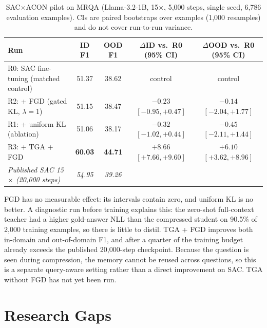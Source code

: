 \documentclass[10pt,a4paper]{article}
\begin{document}
\begin{table}[h]
\centering
\scriptsize
\renewcommand{\arraystretch}{1.12}
\setlength{\tabcolsep}{4pt}
\begin{tabular}{p{}cccc}
\toprule
\textbf{Run} & \textbf{ID F1} & \textbf{OOD F1} &
\textbf{$\Delta$ID vs.\ R0 (95\% CI)} & \textbf{$\Delta$OOD vs.\ R0 (95\% CI)}\\
\midrule
R0: SAC fine-tuning (matched control) & 51.37 & 38.62 & control & control\\
R2: + FGD (gated KL, $\lambda=1$) & 51.15 & 38.47 & $-0.23$ $[-0.95,+0.47]$ & $-0.14$ $[-2.04,+1.77]$\\
R1: + uniform KL (ablation) & 51.06 & 38.17 & $-0.32$ $[-1.02,+0.44]$ & $-0.45$ $[-2.11,+1.44]$\\
R3: + TGA + FGD & \textbf{60.03} & \textbf{44.71} & $\mathbf{+8.66}$ $[+7.66,+9.60]$ & $\mathbf{+6.10}$ $[+3.62,+8.96]$\\
\midrule
\emph{Published SAC 15$\times$ (20,000 steps)} & \emph{54.95} & \emph{39.26} & & \\
\bottomrule
\end{tabular}
\caption{SAC$\times$ACON pilot on MRQA (Llama-3.2-1B, 15$\times$, 5,000 steps,
single seed, 6,786 evaluation examples). CIs are paired bootstraps over
examples (1,000 resamples) and do not cover run-to-run variance.}
\label{tab:sacacon}
\end{table}

FGD has no measurable effect: its intervals contain zero, and uniform KL is
no better. A diagnostic run before training explains this: the zero-shot
full-context teacher had a higher gold-answer NLL than the compressed student
on 90.5\% of 2,000 training examples, so there is little to distil. TGA + FGD
improves both in-domain and out-of-domain F1, and after a quarter of the
training budget already exceeds the published 20,000-step checkpoint. Because
the question is seen during compression, the memory cannot be reused across
questions, so this is a separate query-aware setting rather than a direct
improvement on SAC. TGA without FGD has not yet been run.

\section{Research Gaps}\label{sec:gaps}
\end{document}
